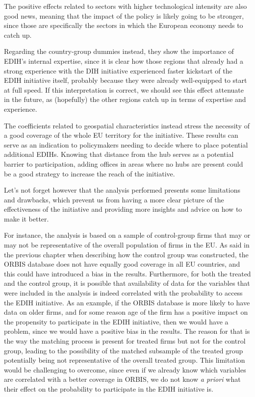 \documentclass[12pt]{report}
\begin{document}
\par The positive effects related to sectors with higher technological intensity are also good news, meaning that the impact of the policy is likely going to be stronger, since those are specifically the sectors in which the European economy needs to catch up.
\par Regarding the country-group dummies instead, they show the importance of EDIH's internal expertise, since it is clear how those regions that already had a strong experience with the DIH initiative experienced faster kickstart of the EDIH initiative itself, probably because they were already well-equipped to start at full speed. If this interpretation is correct, we should see this effect attenuate in the future, as (hopefully) the other regions catch up in terms of expertise and experience.
\par The coefficients related to geospatial characteristics instead stress the necessity of a good coverage of the whole EU territory for the initiative. These results can serve as an indication to policymakers needing to decide where to place potential additional EDIHs. Knowing that distance from the hub serves as a potential barrier to participation, adding offices in areas where no hubs are present could be a good strategy to increase the reach of the initiative.
\par Let's not forget however that the analysis performed presents some limitations and drawbacks, which prevent us from having a more clear picture of the effectiveness of the initiative and providing more insights and advice on how to make it better.
\par For instance, the analysis is based on a sample of control-group firms that may or may not be representative of the overall population of firms in the EU. As said in the previous chapter when describing how the control group was constructed, the ORBIS database does not have equally good coverage in all EU countries, and this could have introduced a bias in the results. Furthermore, for both the treated and the control group, it is possible that availability of data for the variables that were included in the analysis is indeed correlated with the probability to access the EDIH initiative. As an example, if the ORBIS database is more likely to have data on older firms, and for some reason age of the firm has a positive impact on the propensity to participate in the EDIH initiative, then we would have a problem, since we would have a positive bias in the results. The reason for that is the way the matching process is present for treated firms but not for the control group, leading to the possibility of the matched subsample of the treated group potentially being not representative of the overall treated group. This limitation would be challenging to overcome, since even if we already know which variables are correlated with a better coverage in ORBIS, we do not know \textit{a priori} what their effect on the probability to participate in the EDIH initiative is.
\end{document}
